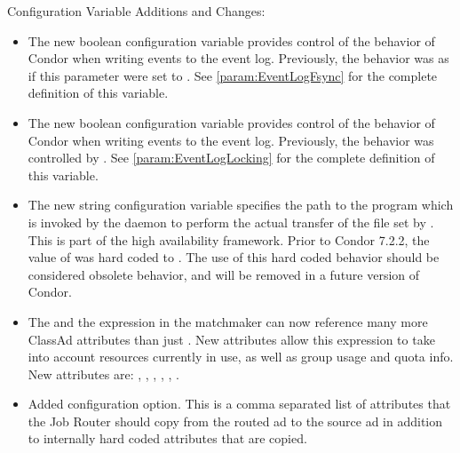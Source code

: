 \noindent Configuration Variable Additions and Changes:

\begin{itemize}

\item The new boolean configuration variable
   provides control of the behavior of
  Condor when writing events to the event log.  Previously,
  the behavior was as if this parameter were set to .
  See \ref{param:EventLogFsync} for the complete definition of
  this variable.

\item The new boolean configuration variable
   provides control of the behavior of
  Condor when writing events to the event log.  Previously,
  the behavior was controlled by .
  See \ref{param:EventLogLocking} for the complete definition of
  this variable.

\item The new string configuration variable 
  specifies the path to the  program which is
  invoked by the  daemon to perform the actual
  transfer of the file set by .
  This is part of the high availability framework.
  Prior to Condor 7.2.2, the value of  was hard coded to
  .  The use of
  this hard coded behavior should be considered obsolete behavior, and
  will be removed in a future version of Condor.

\item The  and the 
  expression in the matchmaker can now reference many more ClassAd
  attributes than just .  New attributes allow
  this expression to take into account resources currently in use, as
  well as group usage and quota info.  New attributes are:
  ,
  ,
  , ,
  ,
  .

\item Added  configuration
  option. This is a comma separated list of attributes that the Job
  Router should copy from the routed ad to the source ad in addition
  to internally hard coded attributes that are copied.


\end{itemize}
